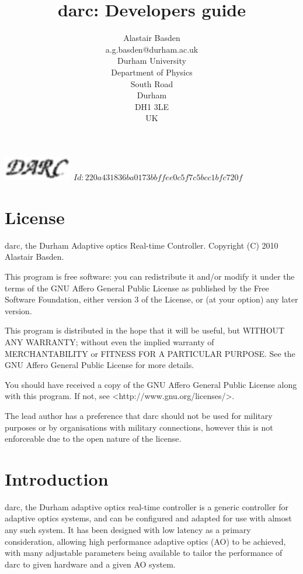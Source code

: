 \documentclass[a4,10pt]{article}
\title{darc: Developers guide}
\author{Alastair Basden \\ a.g.basden@durham.ac.uk \\ Durham University \\ Department of Physics
  \\ South Road \\ Durham \\ DH1 3LE \\ UK}
\providecommand{\gitID}{$Id: 220a431836ba0173bbffee0c5f7c5bcc1bfc720f $}
\newcommand{\ao}{adaptive optics (AO)\renewcommand{\ao}{AO\xspace}\xspace}
\begin{document}
\maketitle
{\hspace{7cm} \includegraphics[width=3cm]{darclogo.eps}}
\vfill
\gitID
%

\pagebreak
\tableofcontents
\pagebreak
\section{License}
darc, the Durham Adaptive optics Real-time Controller.
Copyright (C) 2010 Alastair Basden.

This program is free software: you can redistribute it and/or modify
it under the terms of the GNU Affero General Public License as
published by the Free Software Foundation, either version 3 of the
License, or (at your option) any later version.

This program is distributed in the hope that it will be useful,
but WITHOUT ANY WARRANTY; without even the implied warranty of
MERCHANTABILITY or FITNESS FOR A PARTICULAR PURPOSE.  See the
GNU Affero General Public License for more details.

You should have received a copy of the GNU Affero General Public License
along with this program.  If not, see <http://www.gnu.org/licenses/>.

The lead author has a preference that darc should not be used for
military purposes or by organisations with military connections,
however this is not enforceable due to the open nature of the license.

\section{Introduction}
darc, the Durham adaptive optics real-time controller is a generic
controller for adaptive optics systems, and can be configured and
adapted for use with almost any such system.  It has been designed
with low latency as a primary consideration, allowing high performance
\ao to be achieved, with many adjustable parameters being available to
tailor the performance of darc to given hardware and a given \ao
system.
\end{document}
